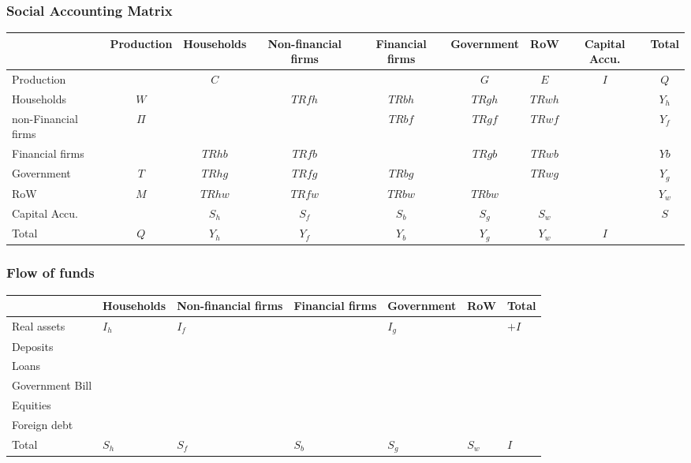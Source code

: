 \documentclass[11pt]{article}
\begin{document}
\subsubsection*{Social Accounting Matrix}
\label{sec:orgb80d04b}

\begin{center}
\begin{tabular}{lcccccccc}
 & Production & Households & Non-financial firms & Financial firms & Government & RoW & Capital Accu. & Total\\
\hline
Production &  & \(C\) &  &  & \(G\) & \(E\) & \(I\) & \(Q\)\\
Households & \(W\) &  & \(TRfh\) & \(TRbh\) & \(TRgh\) & \(TRwh\) &  & \(Y_{h}\)\\
non-Financial firms & \(\Pi\) &  &  & \(TRbf\) & \(TRgf\) & \(TRwf\) &  & \(Y_{f}\)\\
Financial firms &  & \(TRhb\) & \(TRfb\) &  & \(TRgb\) & \(TRwb\) &  & \(Yb\)\\
Government & \(T\) & \(TRhg\) & \(TRfg\) & \(TRbg\) &  & \(TRwg\) &  & \(Y_{g}\)\\
RoW & \(M\) & \(TRhw\) & \(TRfw\) & \(TRbw\) & \(TRbw\) &  &  & \(Y_{w}\)\\
Capital Accu. &  & \(S_{h}\) & \(S_{f}\) & \(S_{b}\) & \(S_{g}\) & \(S_{w}\) &  & \(S\)\\
Total & \(Q\) & \(Y_{h}\) & \(Y_{f}\) & \(Y_{b}\) & \(Y_{g}\) & \(Y_{w}\) & \(I\) & \\
\end{tabular}

\end{center}

\subsubsection*{Flow of funds}
\label{sec:orgb4d5397}

\begin{center}
\begin{tabular}{lllllll}
 & Households & Non-financial firms & Financial firms & Government & RoW & Total\\
\hline
Real assets & \(I_h\) & \(I_f\) &  & \(I_{g}\) &  & \(+I\)\\
Deposits &  &  &  &  &  & \\
Loans &  &  &  &  &  & \\
Government Bill &  &  &  &  &  & \\
Equities &  &  &  &  &  & \\
Foreign debt &  &  &  &  &  & \\
Total & \(S_h\) & \(S_f\) & \(S_b\) & \(S_{g}\) & \(S_{w}\) & \(I\)\\
\end{tabular}

\end{center}
\end{document}
